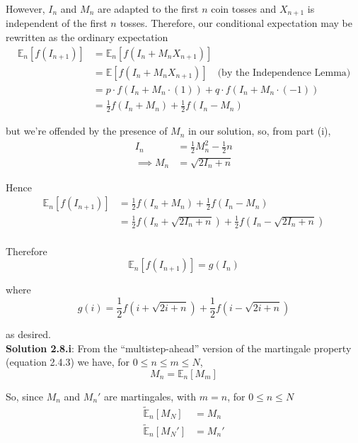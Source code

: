 \documentclass[12pt]{article}
\newlength\tindent
\renewcommand{\indent}{\hspace*{\tindent}}
\newcommand{\E}{\mathbb E}
\begin{document}
\indent However, $I_n$ and $M_n$ are adapted to the first $n$ coin tosses and $X_{n + 1}$ is independent of the first $n$ tosses. Therefore, our conditional expectation may be rewritten as the ordinary expectation
\begin{align*}
 	\E_n \left[ f(I_{n + 1}) \right] &= \E_n \left[ f(I_n + M_nX_{n + 1}) \right] \\
 	&= \E \left[ f(I_n + M_nX_{n + 1}) \right] \quad \text{(by the Independence Lemma)} \\
 	&= p\cdot f(I_n + M_n\cdot(1)) + q\cdot f(I_n + M_n\cdot(-1)) \\
 	&= \frac{1}{2} f(I_n + M_n) + \frac{1}{2} f(I_n - M_n)
\end{align*}

but we're offended by the presence of $M_n$ in our solution, so, from part (i),
\begin{align*}
	I_n &= \frac{1}{2}M_n^2 - \frac{1}{2}n \\
	\implies M_n &= \sqrt{2I_n + n}
\end{align*}

Hence
\begin{align*}
 	\E_n \left[ f(I_{n + 1}) \right] &= \frac{1}{2} f(I_n + M_n) + \frac{1}{2} f(I_n - M_n) \\
 	&= \frac{1}{2} f(I_n + \sqrt{2I_n + n}) + \frac{1}{2} f(I_n - \sqrt{2I_n + n}) \\
\end{align*}

Therefore
\begin{equation*}
	\E_n[f(I_{n + 1})] = g(I_n)
\end{equation*}

where
\begin{equation*}
	g(i) = \frac{1}{2}f(i + \sqrt{2i + n}) + \frac{1}{2}f(i - \sqrt{2i + n})
\end{equation*}

as desired. \\

{\bf Solution 2.8.i}: From the ``multistep-ahead'' version of the martingale property (equation 2.4.3) we have, for $0 \leq n \leq m \leq N$,
\begin{equation*}
	M_n = \E_n [M_m]
\end{equation*}

So, since $M_n$ and $M_n'$ are martingales, with $m = n$, for $0 \leq n \leq N$
\begin{align*}
	\tilde{\E}_n[M_N] &= M_n \\
	\tilde{\E}_n[M_N'] &= M_n'
\end{align*}
\end{document}
